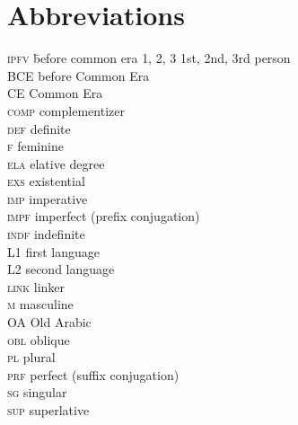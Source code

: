 \documentclass[output=paper]{langsci/langscibook}
\begin{document}
\section*{Abbreviations}
\setlength{\columnsep}{30pt}
\begin{multicols}{2}
\begin{tabbing}
\textsc{ipfv} \hspace{1em} \= before common era\kill
\textsc{1, 2, 3} \> 1st, 2nd, 3rd person \\
BCE \> before Common Era \\
CE \> Common Era \\
\textsc{comp} \> {complementizer} \\
\textsc{def} \> {definite} \\
\textsc{f} \> feminine \\
\textsc{ela} \> {elative} degree \\
\textsc{exs} \> {existential} \\
\textsc{imp} \> imperative \\
\textsc{impf} \> imperfect (prefix conjugation) \\
\textsc{indf} \> indefinite \\
L1 \> first language \\
L2 \> second language \\
\textsc{link} \> linker \\
\textsc{m} \> masculine \\
{OA} \> Old Arabic \\
\textsc{obl} \> oblique \\
\textsc{pl} \> plural \\
\textsc{prf} \> perfect (suffix conjugation) \\
\textsc{sg} \> singular \\
\textsc{sup} \> {superlative}
\end{tabbing}
\end{multicols}


\sloppy
\printbibliography[heading=subbibliography,notkeyword=this] 
\end{document}
